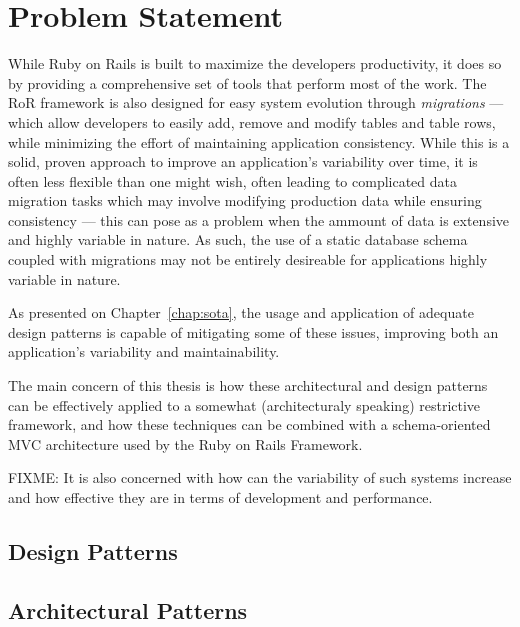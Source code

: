\chapter{Problem Statement}\label{chap:problem_statement}

While Ruby on Rails is built to maximize the developers productivity, it does so by providing a comprehensive set of tools that perform most of the work. The RoR framework is also designed for easy system evolution through \emph{migrations} --- which allow developers to easily add, remove and modify tables and table rows, while minimizing the effort of maintaining application consistency. While this is a solid, proven approach to improve an application's variability over time, it is often less flexible than one might wish, often leading to complicated data migration tasks which may involve modifying production data while ensuring consistency --- this can pose as a problem when the ammount of data is extensive and highly variable in nature. As such, the use of a static database schema coupled with migrations may not be entirely desireable for applications highly variable in nature.

As presented on Chapter~\ref{chap:sota}, the usage and application of adequate design patterns is capable of mitigating some of these issues, improving both an application's variability and maintainability.

The main concern of this thesis is how these architectural and design patterns can be effectively applied to a somewhat (architecturaly speaking) restrictive framework, and how these techniques can be combined with a schema-oriented MVC architecture used by the Ruby on Rails Framework.

FIXME: It is also concerned with how can the variability of such systems increase and how effective they are in terms of development and performance.

\section{Design Patterns}\label{sec:design_patterns}

\section{Architectural Patterns}\label{sec:architectural_patterns}

